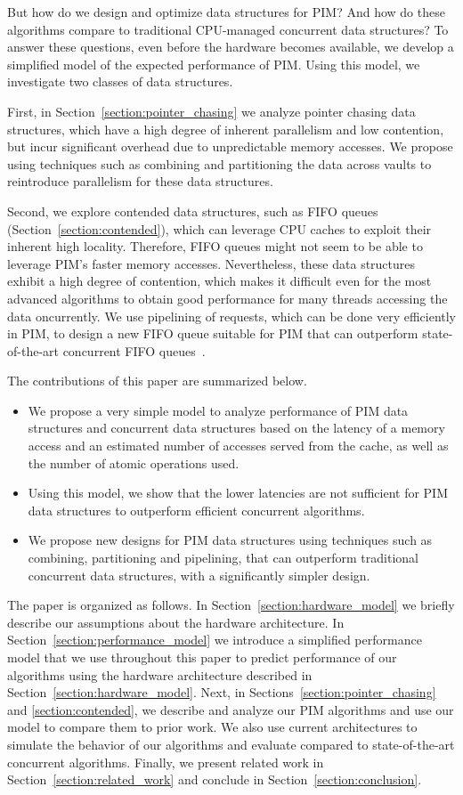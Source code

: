 But how do we design and optimize data structures for PIM? And how do these algorithms compare to traditional CPU-managed concurrent data structures? To answer these questions, even before the hardware becomes available, we develop a simplified model of the expected performance of PIM. Using this model, we 
investigate two classes of data structures. 

First, in Section~\ref{section:pointer_chasing} we analyze pointer chasing data 
structures, which have a high degree of inherent parallelism and low contention, but incur significant 
overhead due to unpredictable memory accesses. 
We propose using techniques such as combining and partitioning 
the data across vaults to reintroduce parallelism for these data structures.

Second, we explore contended data structures, such as FIFO queues (Section~\ref{section:contended}), 
which can leverage CPU caches to exploit their inherent high locality. 
Therefore, FIFO queues might not seem to be able to leverage PIM's faster memory accesses. 
Nevertheless, these data structures exhibit a high degree of contention, which makes it difficult even for 
the most advanced algorithms to obtain good performance for many threads accessing the data oncurrently. 
We use pipelining of requests, which can be done very efficiently in PIM, to design a new FIFO queue 
suitable for PIM that can outperform state-of-the-art concurrent FIFO queues~\cite{Morrison13, Hendler10}.

The contributions of this paper are summarized below.
\begin{itemize}
\item We propose a very simple model to analyze performance of PIM data structures and
concurrent data structures based on the latency of a memory access and an estimated number of 
accesses served from the cache, as well as the number of atomic operations used. 
\item Using this model, we show that the lower latencies are not sufficient for PIM data structures
to outperform efficient concurrent algorithms. 
 \item We propose new designs for PIM 
data structures using 
techniques such as combining, partitioning and pipelining, that can outperform traditional 
concurrent data structures, with a significantly simpler design. 
\end{itemize}


The paper is organized as follows. In Section~\ref{section:hardware_model} we briefly describe 
our assumptions about the hardware architecture. 
In Section~\ref{section:performance_model} we introduce a simplified performance model 
that we use throughout this paper to predict performance of our algorithms using the hardware 
architecture described in Section~\ref{section:hardware_model}. 
Next, in Sections~\ref{section:pointer_chasing} and \ref{section:contended}, 
we describe and analyze our PIM algorithms and use our model to compare them to prior work. 
We also use current architectures to simulate the behavior of our algorithms and 
evaluate compared to state-of-the-art concurrent algorithms. 
Finally, we present related work in Section~\ref{section:related_work} 
and conclude in Section~\ref{section:conclusion}. 

